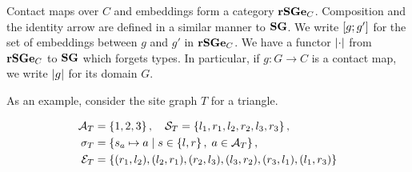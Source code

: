 Contact maps over $C$ and embeddings form a category $\mathbf{rSGe}_C$.
Composition and the identity arrow
are defined in a similar manner to $\mathbf{SG}$.
We write $\left[g;g'\right]$ for the set of embeddings
between $g$ and $g'$ in $\mathbf{rSGe}_C$.
We have a functor $\left|\cdot\right|$
from $\mathbf{rSGe}_C$ to $\mathbf{SG}$ which forgets types.
In particular, if $g: G \to C$ is a contact map,
we write $\left|g\right|$ for its domain $G$.

As an example, consider the site graph $T$ for a triangle.

\vspace{-.2cm}
\begin{minipage}{.5\textwidth}
  \begin{align*}
    \mathcal{A}_T &= \left\{ 1, 2, 3 \right\}, \quad
    \mathcal{S}_T = \left\{ l_1, r_1, l_2, r_2, l_3, r_3 \right\}, \\
    \sigma_T &= \left\{ s_a \mapsto a \; | \; 
      s \in \left\{ l, r \right\},\; a \in \mathcal{A}_T \right\}, \\
    \mathcal{E}_T &= \left\{ (r_1, l_2), (l_2, r_1), (r_2, l_3),
      (l_3, r_2), (r_3, l_1), (l_1, r_3) \right\}
  \end{align*}
\end{minipage}
\begin{minipage}{.32\textwidth}
  \vspace{.7cm}
  \begin{center}
  \end{center}
\end{minipage}
\newline
\vspace{.2cm}

